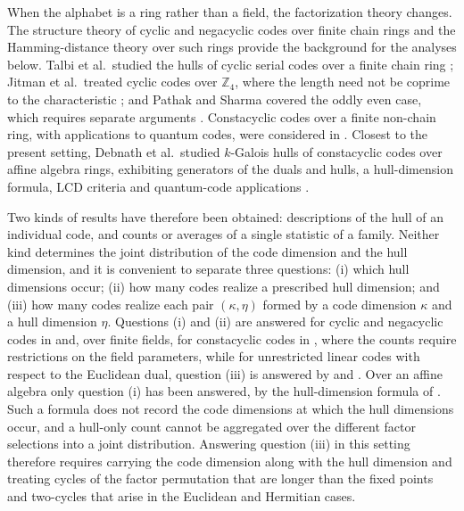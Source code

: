 When the alphabet is a ring rather than a field, the factorization theory
changes. The structure theory of cyclic and negacyclic codes over finite chain
rings \cite{dinhLopezPermouth2004} and the Hamming-distance theory over such
rings \cite{nortonSalagean2000} provide the background for the analyses below.
Talbi et al.\ studied the hulls of cyclic serial codes over a finite chain ring
\cite{talbi2022}; Jitman et al.\ treated cyclic codes over $\mathbb{Z}_4$, where
the length need not be coprime to the characteristic \cite{jitmanZ4}; and Pathak
and Sharma covered the oddly even case, which requires separate arguments
\cite{pathakZ4}. Constacyclic codes over a finite non-chain ring, with
applications to quantum codes, were considered in \cite{zhang2026}. Closest to
the present setting, Debnath et al.\ studied $k$-Galois hulls of constacyclic
codes over affine algebra rings, exhibiting generators of the duals and hulls, a
hull-dimension formula, LCD criteria and quantum-code applications
\cite{debnathAffine2026}.

Two kinds of results have therefore been obtained: descriptions of the hull of
an individual code, and counts or averages of a single statistic of a family.
Neither kind determines the joint distribution of the code dimension and the
hull dimension, and it is convenient to separate three questions: (i) which hull
dimensions occur; (ii) how many codes realize a prescribed hull dimension; and
(iii) how many codes realize each pair $(\kappa,\eta)$ formed by a code
dimension $\kappa$ and a hull dimension $\eta$. Questions (i) and (ii) are
answered for cyclic and negacyclic codes in \cite{sangwisut2015} and, over
finite fields, for constacyclic codes in \cite{debnathConstacyclic2023}, where
the counts require restrictions on the field parameters, while for unrestricted
linear codes with respect to the Euclidean dual, question (iii) is answered by
\cite{sendrier1997} and \cite{bouyuklieva2026}. Over an affine algebra only
question (i) has been answered, by the hull-dimension formula of
\cite{debnathAffine2026}. Such a formula does not record the code dimensions at
which the hull dimensions occur, and a hull-only count cannot be aggregated over
the different factor selections into a joint distribution. Answering question
(iii) in this setting therefore requires carrying the code dimension along with
the hull dimension and treating cycles of the factor permutation that are longer
than the fixed points and two-cycles that arise in the Euclidean and Hermitian
cases.

